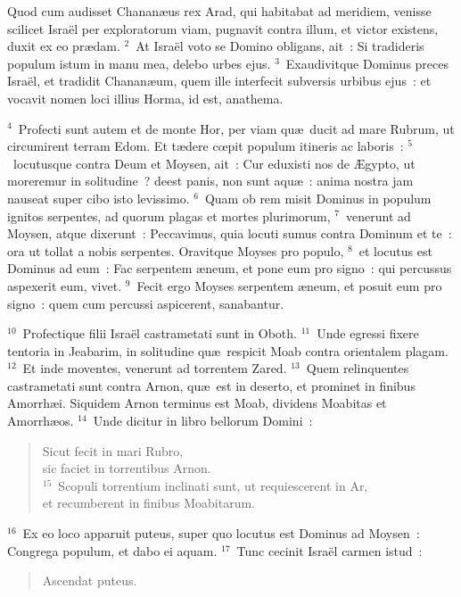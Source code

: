 \lettrine[lines=3,image=true,loversize=0.05,lraise=-0.03]{Q}{}uod cum audisset Chanan\ae us rex Arad, qui habitabat ad meridiem, venisse scilicet Isra\"el per exploratorum viam, pugnavit contra illum, et victor existens, duxit ex eo pr\ae dam.
${}^{2}$~At Isra\"el voto se Domino obligans, ait~: Si tradideris populum istum in manu mea, delebo urbes ejus.
${}^{3}$~Exaudivitque Dominus preces Isra\"el, et tradidit Chanan\ae um, quem ille interfecit subversis urbibus ejus~: et vocavit nomen loci illius Horma, id est, anathema.


${}^{4}$~Profecti sunt autem et de monte Hor, per viam qu\ae\ ducit ad mare Rubrum, ut circumirent terram Edom. Et t\ae dere cœpit populum itineris ac laboris~:
${}^{5}$~locutusque contra Deum et Moysen, ait~: Cur eduxisti nos de \AE gypto, ut moreremur in solitudine~? deest panis, non sunt aqu\ae~: anima nostra jam nauseat super cibo isto levissimo.
${}^{6}$~Quam ob rem misit Dominus in populum ignitos serpentes, ad quorum plagas et mortes plurimorum,
${}^{7}$~venerunt ad Moysen, atque dixerunt~: Peccavimus, quia locuti sumus contra Dominum et te~: ora ut tollat a nobis serpentes. Oravitque Moyses pro populo,
${}^{8}$~et locutus est Dominus ad eum~: Fac serpentem \ae neum, et pone eum pro signo~: qui percussus aspexerit eum, vivet.
${}^{9}$~Fecit ergo Moyses serpentem \ae neum, et posuit eum pro signo~: quem cum percussi aspicerent, sanabantur.


${}^{10}$~Profectique filii Isra\"el castrametati sunt in Oboth.
${}^{11}$~Unde egressi fixere tentoria in Jeabarim, in solitudine qu\ae\ respicit Moab contra orientalem plagam.
${}^{12}$~Et inde moventes, venerunt ad torrentem Zared.
${}^{13}$~Quem relinquentes castrametati sunt contra Arnon, qu\ae\ est in deserto, et prominet in finibus Amorrh\ae i. Siquidem Arnon terminus est Moab, dividens Moabitas et Amorrh\ae os.
${}^{14}$~Unde dicitur in libro bellorum Domini~: \begin{flushleft}\begin{verse}Sicut fecit in mari Rubro,\\ sic faciet in torrentibus Arnon.\\
${}^{15}$~Scopuli torrentium inclinati sunt, ut requiescerent in Ar,\\ et recumberent in finibus Moabitarum.\end{verse}\end{flushleft}


${}^{16}$~Ex eo loco apparuit puteus, super quo locutus est Dominus ad Moysen~: Congrega populum, et dabo ei aquam.
${}^{17}$~Tunc cecinit Isra\"el carmen istud~: \begin{flushleft}\begin{verse}Ascendat puteus.\end{verse}\end{flushleft}

